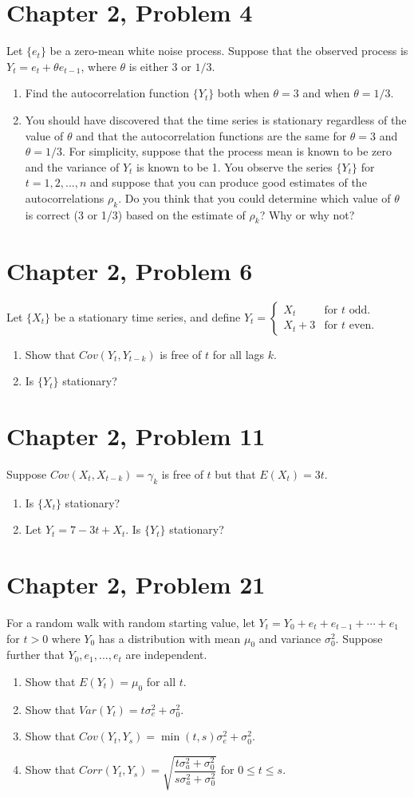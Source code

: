 \documentclass[11pt]{article}
\newif\ifclearpage
\newcommand{\problem}[1]{\section*{#1}}
\newcommand{\solution}{\hrulefill}
\newcommand{\maybeclearpage}{\ifclearpage\clearpage\fi}
\begin{document}
\problem{Chapter 2, Problem 4}
Let $\{e_t\}$ be a zero-mean white noise process. Suppose that the observed process is $Y_t = e_t + \theta e_{t-1}$, where $\theta$ is either $3$ or $1/3$.
\begin{enumerate}
	\item Find the autocorrelation function $\{Y_t\}$ both when $\theta = 3$ and when $\theta = 1/3$.
	\item You should have discovered that the time series is stationary regardless of the value of $\theta$ and that the autocorrelation functions are the same for $\theta=3$ and $\theta=1/3$.  For simplicity, suppose that the process mean is known to be zero and the variance of $Y_t$ is known to be 1. You observe the series $\{Y_t\}$ for $t = 1,2,...,n$ and suppose that you can produce good estimates of the autocorrelations $\rho_k$. Do you think that you could determine which value of $\theta$ is correct (3 or 1/3) based on the estimate of $\rho_k$? Why or why not?
\end{enumerate}

\solution


\maybeclearpage
\problem{Chapter 2, Problem 6}
Let $\{X_t\}$ be a stationary time series, and define $Y_t = \begin{cases} 
      X_t & \text{for } t \text{ odd}. \\
      X_t + 3 & \text{for } t \text{ even}.
   \end{cases}$
\begin{enumerate}
	\item Show that $Cov(Y_t,Y_{t-k})$ is free of $t$ for all lags $k$.
	\item Is $\{Y_t\}$ stationary?
\end{enumerate}

\solution



\maybeclearpage
\problem{Chapter 2, Problem 11}
Suppose $Cov(X_t,X_{t-k}) = \gamma_k$ is free of $t$ but that $E(X_t) = 3t$.
\begin{enumerate}
	\item Is $\{X_t\}$ stationary?
	\item Let  $Y_t = 7 - 3t + X_t$. Is $\{Y_t\}$ stationary?
\end{enumerate} 

\solution


\maybeclearpage
\problem{Chapter 2, Problem 21}
For a random walk with random starting value, let $Y_t = Y_0 + e_t + e_{t-1} + \cdots + e_1$ for $t>0$ where $Y_0$ has a distribution with mean $\mu_0$ and variance $\sigma_0^2$. Suppose further that $Y_0,e_1,...,e_t$ are independent.
\begin{enumerate}
	\item Show that $E(Y_t) = \mu_0$ for all $t$.
	\item Show that $Var(Y_t) = t\sigma_e^2 + \sigma_0^2$.
	\item Show that $Cov(Y_t,Y_s) = \min(t,s)\sigma_e^2 + \sigma_0^2$.
	\item Show that $Corr(Y_t,Y_s) = \sqrt{\dfrac{t\sigma_a^2 + \sigma_0^2}{s\sigma_a^2 + \sigma_0^2}}$ for $0 \leq t \leq s$.
\end{enumerate}
\end{document}
